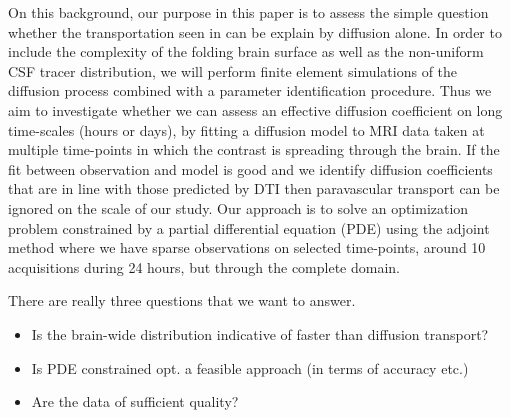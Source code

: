 \documentclass[12pt,a4paper]{article}
\begin{document}
On this background, our purpose in this paper is to assess the simple question whether the  
transportation seen in \cite{ringstad2018brain} can be explain by diffusion alone. In order
to include the complexity of the folding brain surface as well as the non-uniform CSF tracer distribution, we
will perform finite element simulations of the diffusion process combined with a parameter identification procedure. 
Thus we aim to investigate whether we can assess an effective diffusion coefficient on long time-scales (hours or days), by fitting a diffusion model to MRI data taken at multiple time-points in which the contrast is spreading through the brain. If the fit between observation and model is good and we identify diffusion coefficients that are 
in line with those predicted by DTI then paravascular transport can be ignored on the scale of our study. 
Our approach is to solve an optimization problem constrained by a partial differential equation (PDE) using the adjoint method where we have sparse observations on selected time-points, around 10 acquisitions during 24 hours, but through
the complete domain. 


There are really three questions that we want to answer.  
\begin{itemize}
\item Is the brain-wide distribution indicative of faster than diffusion transport? 
\item Is PDE constrained opt. a feasible approach (in terms of accuracy etc.)
\item Are the data of sufficient quality? 
\end{itemize}

%
\end{document}
